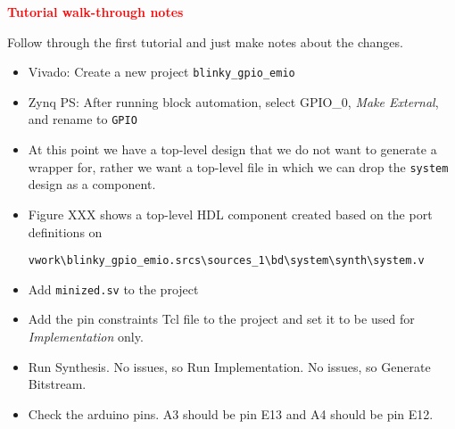 \noindent\textcolor{red}{\bf Tutorial walk-through notes}

Follow through the first tutorial and just make notes about the changes.

\begin{itemize}
\item Vivado: Create a new project \texttt{blinky\_gpio\_emio}
\item Zynq PS: After running block automation, select
GPIO\_0, \emph{Make External}, and rename to \texttt{GPIO}
\item At this point we have a top-level design that we
do not want to generate a wrapper for, rather we want a
top-level file in which we can drop the \texttt{system} design as
a component.
\item Figure XXX shows a top-level HDL component created
based on the port definitions on

\verb+vwork\blinky_gpio_emio.srcs\sources_1\bd\system\synth\system.v+

\item Add \texttt{minized.sv} to the project
\item Add the pin constraints Tcl file to the project and set it
to be used for \emph{Implementation} only.
\item Run Synthesis. No issues, so Run Implementation.
No issues, so Generate Bitstream.
\item Check the arduino pins. A3 should be pin E13 and A4 should be pin E12.


\end{itemize}
